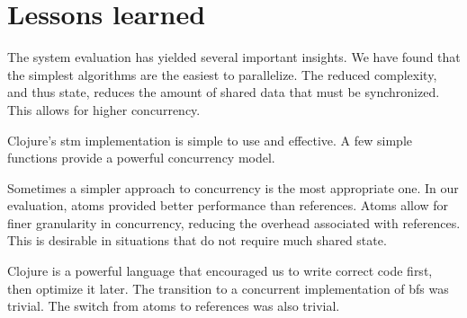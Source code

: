 	\section{Lessons learned}
	\label{sec:lessons-learned}
		The system evaluation has yielded several important insights.  We have found that the simplest algorithms are the easiest to parallelize.  The reduced complexity, and thus state, reduces the amount of shared data that must be synchronized.  This allows for higher concurrency.
		
		Clojure's \gls{stm} implementation is simple to use and effective.  A few simple functions provide a powerful concurrency model.
		
		Sometimes a simpler approach to concurrency is the most appropriate one.  In our evaluation, atoms provided better performance than references.  Atoms allow for finer granularity in concurrency, reducing the overhead associated with references.  This is desirable in situations that do not require much shared state.
		
		Clojure is a powerful language that encouraged us to write correct code first, then optimize it later.  The transition to a concurrent implementation of \gls{bfs} was trivial.  The switch from atoms to references was also trivial.